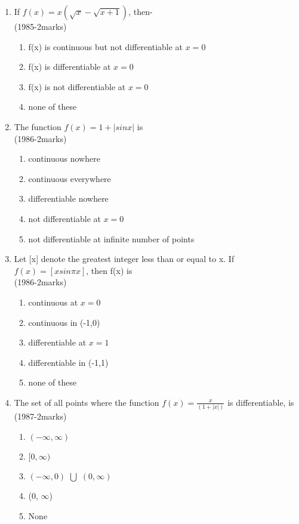 \documentclass[journal,12pt,twocolumn]{IEEEtran}
\theoremstyle{remark}
\begin{document}
\begin{enumerate}
\item If $f(x)=x(\sqrt{x}-\sqrt{x+1})$, then- \\
\hfill{(1985-2marks)} 
\begin{enumerate}[label=\alph*)]
    \item f(x) is continuous but not differentiable at $x=0$
    \item f(x) is differentiable at $x=0$
    \item f(x) is not differentiable at $x=0$
    \item none of these \\
\end{enumerate}

\item The function $f(x)=1+|sinx|$ is \\
\hfill{(1986-2marks)} 
\begin{enumerate}[label=\alph*)]
    \item continuous nowhere
    \item continuous everywhere
    \item differentiable nowhere 
    \item not differentiable at $x=0$
    \item not differentiable at infinite number of points \\
\end{enumerate} 

\item Let [x] denote the greatest integer less than or equal to x. If $f(x)=[xsin \pi x]$, then f(x) is \\
\hfill{(1986-2marks)} 
\begin{enumerate}[label=\alph*)]
    \item continuous at $x=0$
    \item continuous in (-1,0)
    \item differentiable at $x=1$ 
    \item differentiable in (-1,1) 
    \item none of these \\
\end{enumerate}


\item The set of all points where the function $f(x)=\frac{x}{(1+|x|)}$ is differentiable, is \\
\hfill{(1987-2marks)} 

\begin{enumerate}
    \item \((- \infty, \infty)\)
    \item \([0, \infty)\)
    \item \((- \infty,0)\) $\bigcup$ \((0, \infty)\)
    \item (0, $\infty$)
    \item None \\
\end{enumerate}


\end{enumerate}
\end{document}
